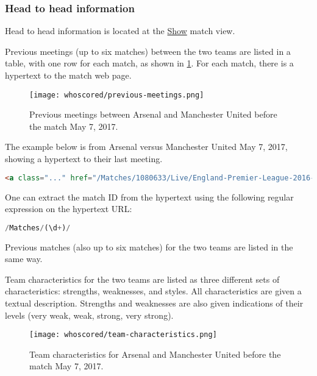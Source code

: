 \subsubsection{Head to head information}

Head to head information is located at the \url{Show} match view.

Previous meetings (up to six matches) between the two teams are listed in a table, with one row for each match, as shown in \cref{fig:whoscored-previous-meetings}. For each match, there is a hypertext to the match web page.
\begin{figure}
    \centering
    \texttt{[image: whoscored/previous-meetings.png]}
    \caption{Previous meetings between Arsenal and Manchester United before the match May 7, 2017.}
    \label{fig:whoscored-previous-meetings}
\end{figure}

The example below is from Arsenal versus Manchester United May 7, 2017, showing a hypertext to their last meeting.
\begin{lstlisting}[language=HTML,caption={Hypertext to the last meeting before the match between Arsenal and Manchester United May 7, 2017.}]
    <a class="..." href="/Matches/1080633/Live/England-Premier-League-2016-2017-Manchester-United-Arsenal">1 : 1</a>
\end{lstlisting}
One can extract the match ID from the hypertext using the following regular expression on the hypertext URL:
\begin{lstlisting}[language=Python,caption={Regular expression used to extract match ID from hypertext.}]
    /Matches/(\d+)/
\end{lstlisting}

Previous matches (also up to six matches) for the two teams are listed in the same way.

Team characteristics for the two teams are listed as three different sets of characteristics: strengths, weaknesses, and styles. All characteristics are given a textual description. Strengths and weaknesses are also given indications of their levels (very weak, weak, strong, very strong).
\begin{figure}
    \centering
    \texttt{[image: whoscored/team-characteristics.png]}
    \caption{Team characteristics for Arsenal and Manchester United before the match May 7, 2017.}
    \label{fig:whoscored-team-characteristics}
\end{figure}

\clearpage